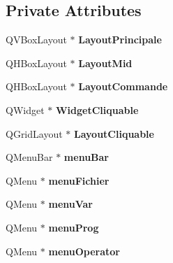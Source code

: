 \subsection*{Private Attributes}
\begin{DoxyCompactItemize}
\item 
Q\+V\+Box\+Layout $\ast$ {\bfseries Layout\+Principale}\hypertarget{class_q_computer_a3260c067e4f400281fc046953373302f}{}\label{class_q_computer_a3260c067e4f400281fc046953373302f}

\item 
Q\+H\+Box\+Layout $\ast$ {\bfseries Layout\+Mid}\hypertarget{class_q_computer_a117c20afb8686988c8422357c3a85323}{}\label{class_q_computer_a117c20afb8686988c8422357c3a85323}

\item 
Q\+H\+Box\+Layout $\ast$ {\bfseries Layout\+Commande}\hypertarget{class_q_computer_ab52147840d7b47f5b2315e28d87b38d3}{}\label{class_q_computer_ab52147840d7b47f5b2315e28d87b38d3}

\item 
Q\+Widget $\ast$ {\bfseries Widget\+Cliquable}\hypertarget{class_q_computer_ab06f91b6f9af46f11a47731b1c6825ed}{}\label{class_q_computer_ab06f91b6f9af46f11a47731b1c6825ed}

\item 
Q\+Grid\+Layout $\ast$ {\bfseries Layout\+Cliquable}\hypertarget{class_q_computer_ac69779eb75d4054ff7297cf39f2449f7}{}\label{class_q_computer_ac69779eb75d4054ff7297cf39f2449f7}

\item 
Q\+Menu\+Bar $\ast$ {\bfseries menu\+Bar}\hypertarget{class_q_computer_a04b5e45e31e298a56814235f295f1b7e}{}\label{class_q_computer_a04b5e45e31e298a56814235f295f1b7e}

\item 
Q\+Menu $\ast$ {\bfseries menu\+Fichier}\hypertarget{class_q_computer_aa169ae8cc70af8cf02f46aff7d74463b}{}\label{class_q_computer_aa169ae8cc70af8cf02f46aff7d74463b}

\item 
Q\+Menu $\ast$ {\bfseries menu\+Var}\hypertarget{class_q_computer_a5741c4e4a0bada87c975f100616cb87e}{}\label{class_q_computer_a5741c4e4a0bada87c975f100616cb87e}

\item 
Q\+Menu $\ast$ {\bfseries menu\+Prog}\hypertarget{class_q_computer_a407adf058e947f103bacc814ec5b609c}{}\label{class_q_computer_a407adf058e947f103bacc814ec5b609c}

\item 
Q\+Menu $\ast$ {\bfseries menu\+Operator}\hypertarget{class_q_computer_af74bc7fd98b2330acc4831944c9dc4a5}{}\label{class_q_computer_af74bc7fd98b2330acc4831944c9dc4a5}


\end{DoxyCompactItemize}
